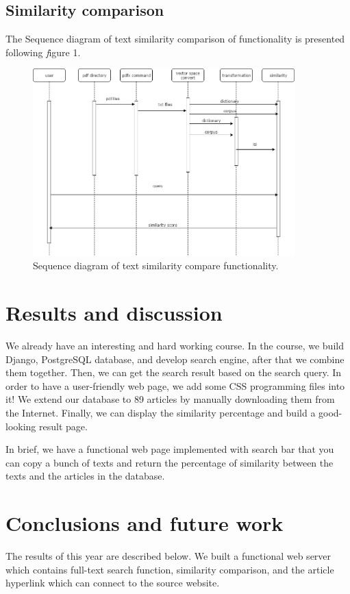\documentclass[a4paper,twocolumn,twoside]{article}
\begin{document}
	\subsection{Similarity comparison}
The Sequence diagram of text  similarity  comparison of functionality is presented  following \textit figure 1. 
	\begin{figure}[htb]
		\begin{center}
			\includegraphics[width=0.9\textwidth]{Rainy_Sequence_diagram}
		\end{center}
		\caption{Sequence diagram of text similarity compare functionality.\label{Sequence diagram}}
	\end{figure}


	\newpage
	\section{Results and discussion}
We already have an interesting and hard working course. In the course, we build Django, PostgreSQL database, and develop search engine, after that we combine them together. Then, we can get the search result based on the search query. In order to have a user-friendly web page, we add some CSS programming files into it! We extend our database to 89 articles by manually downloading them from the Internet. Finally, we can display the similarity percentage and build a good-looking result page.

In brief, we have a functional web page implemented with search bar that you can copy a bunch of texts and return the percentage of similarity between the texts and the articles in the database.

	\section{Conclusions and future work}
    The results of this year are described below. We built a functional web server which contains full-text search function, similarity comparison, and the article hyperlink which can connect to the source website.
		
	
	\clearpage 
\end{document}
